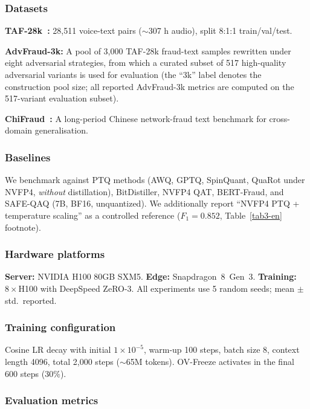 \documentclass[final,5p,times,number]{elsarticle}
\begin{document}
\subsubsection{Datasets}

\textbf{TAF-28k~\cite{1}:} 28{,}511 voice-text pairs ($\sim$307 h audio), split 8:1:1 train/val/test.

\textbf{AdvFraud-3k:} A pool of 3{,}000 TAF-28k fraud-text samples rewritten under eight adversarial strategies, from which a curated subset of 517 high-quality adversarial variants is used for evaluation (the ``3k'' label denotes the construction pool size; all reported AdvFraud-3k metrics are computed on the 517-variant evaluation subset).

\textbf{ChiFraud~\cite{chifraud}:} A long-period Chinese network-fraud text benchmark for cross-domain generalisation.

\subsubsection{Baselines}

We benchmark against PTQ methods (AWQ, GPTQ, SpinQuant, QuaRot under NVFP4, \emph{without} distillation), BitDistiller, NVFP4 QAT, BERT-Fraud, and SAFE-QAQ (7B, BF16, unquantized). We additionally report ``NVFP4 PTQ + temperature scaling'' as a controlled reference ($F_1=0.852$, Table~\ref{tab3-en} footnote).

\subsubsection{Hardware platforms}

\textbf{Server:} NVIDIA H100 80GB SXM5. \textbf{Edge:} Snapdragon~8~Gen~3. \textbf{Training:} $8\times$H100 with DeepSpeed ZeRO-3. All experiments use 5 random seeds; mean $\pm$ std.\ reported.

\subsubsection{Training configuration}

Cosine LR decay with initial $1\times 10^{-5}$, warm-up 100 steps, batch size 8, context length 4096, total 2{,}000 steps ($\sim$65M tokens). OV-Freeze activates in the final 600 steps (30\%).

\subsubsection{Evaluation metrics}
\end{document}
